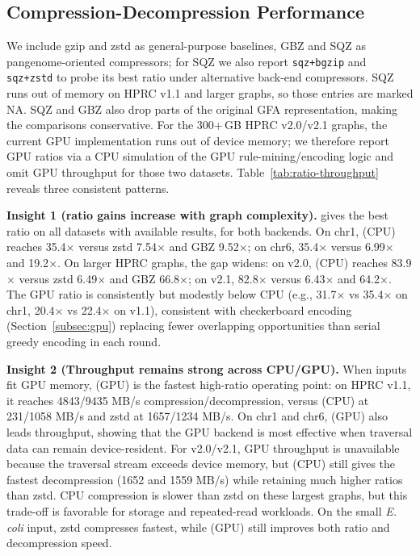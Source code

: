 \subsection{Compression-Decompression Performance}\label{subsec:compression-performance}

We include gzip and zstd as general-purpose baselines, GBZ and SQZ as pangenome-oriented compressors; for SQZ we also report \texttt{sqz+bgzip} and \texttt{sqz+zstd} to probe its best ratio under alternative back-end compressors.
SQZ runs out of memory on HPRC v1.1 and larger graphs, so those entries are marked NA.
SQZ and GBZ also drop parts of the original GFA representation, making the \gfaz comparisons conservative.
For the 300+\,GB HPRC v2.0/v2.1 graphs, the current GPU implementation runs out of device memory; we therefore report GPU ratios via a CPU simulation of the GPU rule-mining/encoding logic and omit GPU throughput for those two datasets.
Table~\ref{tab:ratio-throughput} reveals three consistent patterns.


\noindent \textbf{Insight 1 (ratio gains increase with graph complexity).}
\gfaz gives the best ratio on all datasets with available results, for both backends. On chr1, \gfaz(CPU) reaches 35.4$\times$ versus zstd 7.54$\times$ and GBZ 9.52$\times$; on chr6, 35.4$\times$ versus 6.99$\times$ and 19.2$\times$.
On larger HPRC graphs, the gap widens: on v2.0, \gfaz(CPU) reaches 83.9$\times$ versus zstd 6.49$\times$ and GBZ 66.8$\times$; on v2.1, 82.8$\times$ versus 6.43$\times$ and 64.2$\times$.
The GPU ratio is consistently but modestly below CPU (e.g., 31.7$\times$ vs 35.4$\times$ on chr1, 20.4$\times$ vs 22.4$\times$ on v1.1), consistent with checkerboard encoding (Section~\ref{subsec:gpu}) replacing fewer overlapping opportunities than serial greedy encoding in each round.

\noindent \textbf{Insight 2 (Throughput remains strong across CPU/GPU).}
When inputs fit GPU memory, \gfaz(GPU) is the fastest high-ratio operating point: on HPRC v1.1, it reaches 4843/9435 MB/s compression/decompression, versus \gfaz(CPU) at 231/1058 MB/s and zstd at 1657/1234 MB/s.
On chr1 and chr6, \gfaz(GPU) also leads throughput, showing that the GPU backend is most effective when traversal data can remain device-resident.
For v2.0/v2.1, GPU throughput is unavailable because the traversal stream exceeds device memory, but \gfaz(CPU) still gives the fastest decompression (1652 and 1559 MB/s) while retaining much higher ratios than zstd.
CPU compression is slower than zstd on these largest graphs, but this trade-off is favorable for storage and repeated-read workloads.
On the small \emph{E. coli} input, zstd compresses fastest, while \gfaz(GPU) still improves both ratio and decompression speed.

